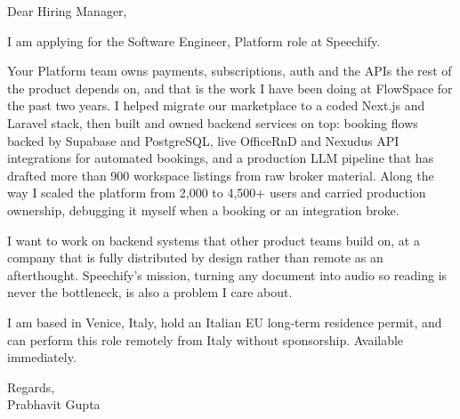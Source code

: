 \documentclass[a4paper,11pt]{article}
\begin{document}
Dear Hiring Manager,

I am applying for the Software Engineer, Platform role at Speechify.

Your Platform team owns payments, subscriptions, auth and the APIs the rest of the product depends on, and that is the work I have been doing at FlowSpace for the past two years. I helped migrate our marketplace to a coded Next.js and Laravel stack, then built and owned backend services on top: booking flows backed by Supabase and PostgreSQL, live OfficeRnD and Nexudus API integrations for automated bookings, and a production LLM pipeline that has drafted more than 900 workspace listings from raw broker material. Along the way I scaled the platform from 2,000 to 4,500+ users and carried production ownership, debugging it myself when a booking or an integration broke.

I want to work on backend systems that other product teams build on, at a company that is fully distributed by design rather than remote as an afterthought. Speechify's mission, turning any document into audio so reading is never the bottleneck, is also a problem I care about.

I am based in Venice, Italy, hold an Italian EU long-term residence permit, and can perform this role remotely from Italy without sponsorship. Available immediately.

Regards,\\
Prabhavit Gupta
\end{document}
